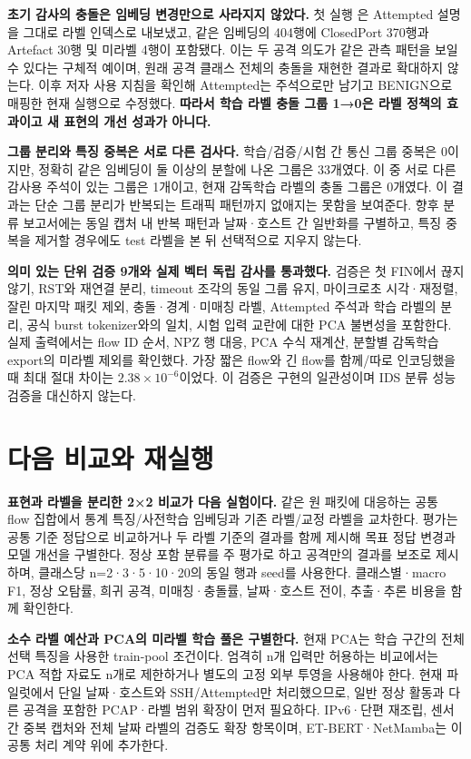 \textbf{초기 감사의 충돌은 임베딩 변경만으로 사라지지 않았다.} 첫 실행 은 Attempted 설명을 그대로 라벨 인덱스로 내보냈고, 같은 임베딩의 404행에 ClosedPort 370행과 Artefact 30행 및 미라벨 4행이 포함됐다. 이는 두 공격 의도가 같은 관측 패턴을 보일 수 있다는 구체적 예이며, 원래 공격 클래스 전체의 충돌을 재현한 결과로 확대하지 않는다. 이후 저자 사용 지침을 확인해 Attempted는 주석으로만 남기고 BENIGN으로 매핑한 현재 실행으로 수정했다. \textbf{따라서 학습 라벨 충돌 그룹 1→0은 라벨 정책의 효과이고 새 표현의 개선 성과가 아니다.}

\textbf{그룹 분리와 특징 중복은 서로 다른 검사다.} 학습/검증/시험 간 통신 그룹 중복은 0이지만, 정확히 같은 임베딩이 둘 이상의 분할에 나온 그룹은 33개였다. 이 중 서로 다른 감사용 주석이 있는 그룹은 1개이고, 현재 감독학습 라벨의 충돌 그룹은 0개였다. 이 결과는 단순 그룹 분리가 반복되는 트래픽 패턴까지 없애지는 못함을 보여준다. 향후 분류 보고서에는 동일 캡처 내 반복 패턴과 날짜·호스트 간 일반화를 구별하고, 특징 중복을 제거할 경우에도 test 라벨을 본 뒤 선택적으로 지우지 않는다.

\textbf{의미 있는 단위 검증 9개와 실제 벡터 독립 감사를 통과했다.} 검증은 첫 FIN에서 끊지 않기, RST와 재연결 분리, timeout 조각의 동일 그룹 유지, 마이크로초 시각·재정렬, 잘린 마지막 패킷 제외, 충돌·경계·미매칭 라벨, Attempted 주석과 학습 라벨의 분리, 공식 burst tokenizer와의 일치, 시험 입력 교란에 대한 PCA 불변성을 포함한다. 실제 출력에서는 flow ID 순서, NPZ 행 대응, PCA 수식 재계산, 분할별 감독학습 export의 미라벨 제외를 확인했다. 가장 짧은 flow와 긴 flow를 함께/따로 인코딩했을 때 최대 절대 차이는 $2.38\times10^{-6}$이었다. 이 검증은 구현의 일관성이며 IDS 분류 성능 검증을 대신하지 않는다.

\section{다음 비교와 재실행}
\textbf{표현과 라벨을 분리한 2×2 비교가 다음 실험이다.} 같은 원 패킷에 대응하는 공통 flow 집합에서 통계 특징/사전학습 임베딩과 기존 라벨/교정 라벨을 교차한다. 평가는 공통 기준 정답으로 비교하거나 두 라벨 기준의 결과를 함께 제시해 목표 정답 변경과 모델 개선을 구별한다. 정상 포함 분류를 주 평가로 하고 공격만의 결과를 보조로 제시하며, 클래스당 n=2·3·5·10·20의 동일 행과 seed를 사용한다. 클래스별·macro F1, 정상 오탐률, 희귀 공격, 미매칭·충돌률, 날짜·호스트 전이, 추출·추론 비용을 함께 확인한다.

\textbf{소수 라벨 예산과 PCA의 미라벨 학습 풀은 구별한다.} 현재 PCA는 학습 구간의 전체 선택 특징을 사용한 train-pool 조건이다. 엄격히 n개 입력만 허용하는 비교에서는 PCA 적합 자료도 n개로 제한하거나 별도의 고정 외부 투영을 사용해야 한다. 현재 파일럿에서 단일 날짜·호스트와 SSH/Attempted만 처리했으므로, 일반 정상 활동과 다른 공격을 포함한 PCAP·라벨 범위 확장이 먼저 필요하다. IPv6·단편 재조립, 센서 간 중복 캡처와 전체 날짜 라벨의 검증도 확장 항목이며, ET-BERT·NetMamba는 이 공통 처리 계약 위에 추가한다.

